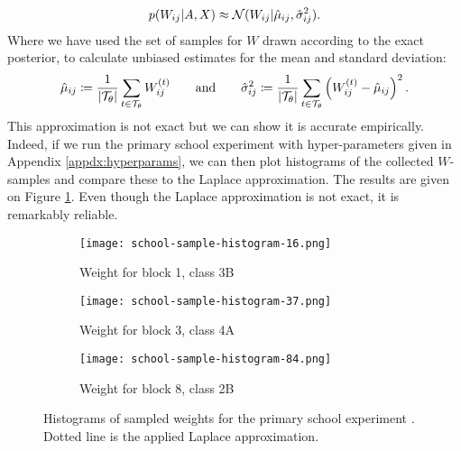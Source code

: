 %
\begin{equation}
	p(W_{ij}|A, X) \approx \mathcal{N}(W_{ij}|\hat{\mu}_{ij}, \hat{\sigma}_{ij}^2).
\end{equation}
%
Where we have used the set of samples for $W$ drawn according to the exact posterior, to calculate unbiased estimates for the mean and standard deviation:
%
\begin{equation}
	\hat{\mu}_{ij} \coloneqq \frac{1}{|\mathcal{T}_\theta|} \sum_{t \in \mathcal{T}_\theta} W_{ij}^{(t)} \qquad \textrm{and} \qquad
	\hat{\sigma}_{ij}^2 \coloneqq \frac{1}{|\mathcal{T}_\theta|} \sum_{t \in \mathcal{T}_\theta} \left( W_{ij}^{(t)} - \hat{\mu}_{ij} \right)^2.
\end{equation}
%
This approximation is not exact but we can show it is accurate empirically. Indeed, if we run the primary school experiment with hyper-parameters given in Appendix \ref{appdx:hyperparams}, we can then plot histograms of the collected $W$-samples and compare these to the Laplace approximation. The results are given on Figure \ref{fig:school-histogram}. Even though the Laplace approximation is not exact, it is remarkably reliable. 

\begin{figure}[!h]
	\centering
	\begin{subfigure}[t]{0.32\linewidth}
		\centering
		\texttt{[image: school-sample-histogram-16.png]}
		\caption{Weight for block 1, class 3B}
	\end{subfigure}
	\hfill
	\begin{subfigure}[t]{0.32\linewidth}
		\centering
		\texttt{[image: school-sample-histogram-37.png]}
		\caption{Weight for block 3, class 4A}
	\end{subfigure}
	\hfill
	\begin{subfigure}[t]{0.32\linewidth}
		\centering
		\texttt{[image: school-sample-histogram-84.png]}
		\caption{Weight for block 8, class 2B}
	\end{subfigure}
	
	\caption{Histograms of sampled weights for the primary school experiment \cite{schools}. Dotted line is the applied Laplace approximation.}
	\label{fig:school-histogram}
\end{figure}

